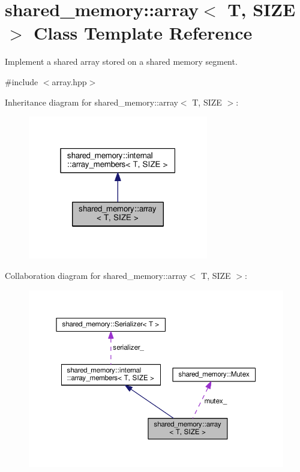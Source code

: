 \hypertarget{classshared__memory_1_1array}{}\section{shared\+\_\+memory\+:\+:array$<$ T, S\+I\+ZE $>$ Class Template Reference}
\label{classshared__memory_1_1array}


Implement a shared array stored on a shared memory segment.  




{\ttfamily \#include $<$array.\+hpp$>$}



Inheritance diagram for shared\+\_\+memory\+:\+:array$<$ T, S\+I\+ZE $>$\+:
\nopagebreak
\begin{figure}[H]
\begin{center}
\leavevmode
\includegraphics[width=223pt]{classshared__memory_1_1array__inherit__graph}
\end{center}
\end{figure}


Collaboration diagram for shared\+\_\+memory\+:\+:array$<$ T, S\+I\+ZE $>$\+:
\nopagebreak
\begin{figure}[H]
\begin{center}
\leavevmode
\includegraphics[width=350pt]{classshared__memory_1_1array__coll__graph}
\end{center}
\end{figure}

